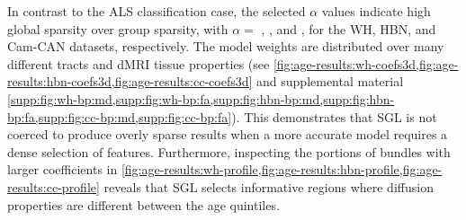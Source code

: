 In contrast to the ALS classification case, the selected $\alpha$ values
indicate high global sparsity over group sparsity, with $\alpha = $
{\whLRatio}, {\hbnLRatio}, and {\ccLRatio}, for the WH, HBN, and Cam-CAN
datasets, respectively. The model weights are distributed over many different
tracts and dMRI tissue properties (see
\cref{fig:age-results:wh-coefs3d,fig:age-results:hbn-coefs3d,fig:age-results:cc-coefs3d}
and supplemental material
\cref{supp:fig:wh-bp:md,supp:fig:wh-bp:fa,supp:fig:hbn-bp:md,supp:fig:hbn-bp:fa,supp:fig:cc-bp:md,supp:fig:cc-bp:fa}).
This demonstrates that SGL is not coerced to produce overly sparse results
when a more accurate model requires a dense selection of features.
Furthermore, inspecting the portions of bundles with larger coefficients in
\cref{fig:age-results:wh-profile,fig:age-results:hbn-profile,fig:age-results:cc-profile}
reveals that SGL selects informative regions where diffusion properties are
different between the age quintiles.

